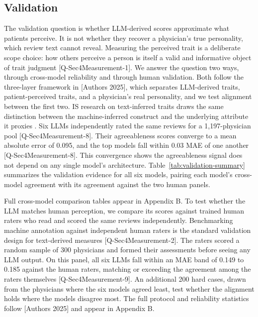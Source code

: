 \subsection{Validation}
The validation question is whether LLM-derived scores approximate what patients perceive. It is not whether they recover a physician's true personality, which review text cannot reveal. Measuring the perceived trait is a deliberate scope choice: how others perceive a person is itself a valid and informative object of trait judgment \cite{TOADD} [Q-Sec4Measurement-1]. We answer the question two ways, through cross-model reliability and through human validation. Both follow the three-layer framework in [Authors 2025], which separates LLM-derived traits, patient-perceived traits, and a physician's real personality, and we test alignment between the first two. IS research on text-inferred traits draws the same distinction between the machine-inferred construct and the underlying attribute it proxies \citep{liu2021assessing, yang2023getting}.
Six LLMs independently rated the same reviews for a 1,197-physician pool [Q-Sec4Measurement-8]. Their agreeableness scores converge to a mean absolute error of 0.095, and the top models fall within 0.03 MAE of one another [Q-Sec4Measurement-8]. This convergence shows the agreeableness signal does not depend on any single model's architecture. Table~\ref{tab:validation-summary} summarizes the validation evidence for all six models, pairing each model's cross-model agreement with its agreement against the two human panels.

Full cross-model comparison tables appear in Appendix B.
To test whether the LLM matches human perception, we compare its scores against trained human raters who read and scored the same reviews independently. Benchmarking machine annotation against independent human raters is the standard validation design for text-derived measures \cite{TOADD} [Q-Sec4Measurement-2]. The raters scored a random sample of 300 physicians and formed their assessments before seeing any LLM output. On this panel, all six LLMs fall within an MAE band of 0.149 to 0.185 against the human raters, matching or exceeding the agreement among the raters themselves [Q-Sec4Measurement-9]. An additional 200 hard cases, drawn from the physicians where the six models agreed least, test whether the alignment holds where the models disagree most. The full protocol and reliability statistics follow [Authors 2025] and appear in Appendix B.
